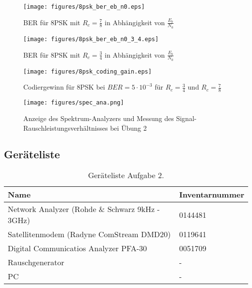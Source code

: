 \documentclass[12pt,a4paper,ngerman]{article}
\begin{document}
	\begin{figure}[h!]
\hspace*{-3cm}\texttt{[image: figures/8psk\_ber\_eb\_n0.eps]} 
\caption{BER für 8PSK mit $R_c = \frac{7}{8}$  in Abhängigkeit von $\frac{E_b}{N_0}$}
	\label{fig:ber_8psk}
	\end{figure}
	\pagebreak
	\begin{figure}[h!]
\hspace*{-3cm}\texttt{[image: figures/8psk\_ber\_eb\_n0\_3\_4.eps]} 
\caption{BER für 8PSK mit $R_c = \frac{3}{4}$  in Abhängigkeit von $\frac{E_b}{N_0}$}
	\label{fig:ber_8psk_3_4}
	\end{figure}
	
		\begin{figure}[h!]
\hspace*{-3cm}\texttt{[image: figures/8psk\_coding\_gain.eps]} 
\caption{Codiergewinn für 8PSK bei $BER = 5\cdot10^{-3}$ für $R_c = \frac{3}{4}$ und $R_c = \frac{7}{8}$}
	\label{fig:8psk_coding_gain}
	\end{figure}
	\pagebreak
	
\begin{figure}[h!]
\texttt{[image: figures/spec\_ana.png]} 
\caption{Anzeige des Spektrum-Analyzers und Messung des Signal-Rauschleistungsverhältnisses bei Übung 2}
	\label{fig:spec_ana}
	\end{figure}	
	
	\pagebreak
	\pagebreak

\subsection{Geräteliste}

\begin{center}
\begin{table}[h!]
\centering

\begin{tabular}{ |l|l| }
  \hline
  Name & Inventarnummer \\
  \hline
  Network Analyzer (Rohde \& Schwarz 9kHz - 3GHz) & 0144481 \\ \hline
  Satellitenmodem (Radyne ComStream DMD20) & 0119641 \\ \hline
  Digital Communicatios Analyzer PFA-30 & 0051709 \\ \hline
  Rauschgenerator & - \\ \hline
  PC & - \\
  \hline
\end{tabular}
\caption{Geräteliste Aufgabe 2.\label{tab:geraeteliste2}}
\end{table}
\end{center}
	
\end{document}
